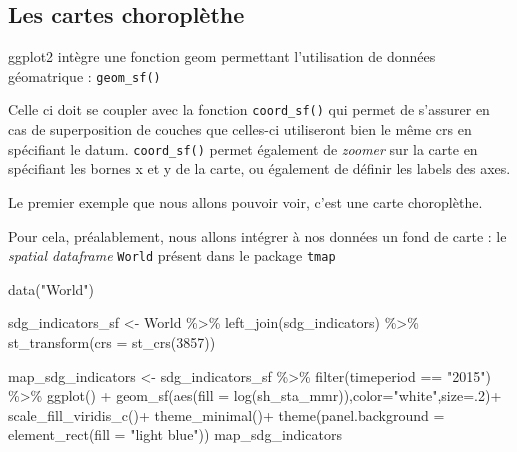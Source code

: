 \documentclass[
]{book}
\newenvironment{Shaded}{\begin{snugshade}}{\end{snugshade}}
\newcommand{\AttributeTok}[1]{\textcolor[rgb]{0.77,0.63,0.00}{#1}}
\newcommand{\DecValTok}[1]{\textcolor[rgb]{0.00,0.00,0.81}{#1}}
\newcommand{\FunctionTok}[1]{\textcolor[rgb]{0.00,0.00,0.00}{#1}}
\newcommand{\NormalTok}[1]{#1}
\newcommand{\OtherTok}[1]{\textcolor[rgb]{0.56,0.35,0.01}{#1}}
\newcommand{\SpecialCharTok}[1]{\textcolor[rgb]{0.00,0.00,0.00}{#1}}
\newcommand{\StringTok}[1]{\textcolor[rgb]{0.31,0.60,0.02}{#1}}
\begin{document}
\hypertarget{les-cartes-choropluxe8the}{%
\subsection{Les cartes choroplèthe}\label{les-cartes-choropluxe8the}}

ggplot2 intègre une fonction geom permettant l'utilisation de données géomatrique : \texttt{geom\_sf()}

Celle ci doit se coupler avec la fonction \texttt{coord\_sf()} qui permet de s'assurer en cas de superposition de couches que celles-ci utiliseront bien le même crs en spécifiant le datum. \texttt{coord\_sf()} permet également de \emph{zoomer} sur la carte en spécifiant les bornes x et y de la carte, ou également de définir les labels des axes.

Le premier exemple que nous allons pouvoir voir, c'est une carte choroplèthe.

Pour cela, préalablement, nous allons intégrer à nos données un fond de carte : le \emph{spatial dataframe} \texttt{World} présent dans le package \texttt{tmap}

\begin{Shaded}
\begin{Highlighting}[]
\FunctionTok{data}\NormalTok{(}\StringTok{"World"}\NormalTok{)}

\NormalTok{sdg\_indicators\_sf }\OtherTok{\textless{}{-}}\NormalTok{ World }\SpecialCharTok{\%\textgreater{}\%}
  \FunctionTok{left\_join}\NormalTok{(sdg\_indicators) }\SpecialCharTok{\%\textgreater{}\%}
  \FunctionTok{st\_transform}\NormalTok{(}\AttributeTok{crs =} \FunctionTok{st\_crs}\NormalTok{(}\DecValTok{3857}\NormalTok{))}
\end{Highlighting}
\end{Shaded}

\begin{Shaded}
\begin{Highlighting}[]
\NormalTok{map\_sdg\_indicators }\OtherTok{\textless{}{-}}\NormalTok{ sdg\_indicators\_sf }\SpecialCharTok{\%\textgreater{}\%} 
  \FunctionTok{filter}\NormalTok{(timeperiod }\SpecialCharTok{==} \StringTok{"2015"}\NormalTok{) }\SpecialCharTok{\%\textgreater{}\%} 
  \FunctionTok{ggplot}\NormalTok{() }\SpecialCharTok{+}
  \FunctionTok{geom\_sf}\NormalTok{(}\FunctionTok{aes}\NormalTok{(}\AttributeTok{fill =} \FunctionTok{log}\NormalTok{(sh\_sta\_mmr)),}\AttributeTok{color=}\StringTok{"white"}\NormalTok{,}\AttributeTok{size=}\NormalTok{.}\DecValTok{2}\NormalTok{)}\SpecialCharTok{+}
  \FunctionTok{scale\_fill\_viridis\_c}\NormalTok{()}\SpecialCharTok{+}
  \FunctionTok{theme\_minimal}\NormalTok{()}\SpecialCharTok{+}
  \FunctionTok{theme}\NormalTok{(}\AttributeTok{panel.background =} \FunctionTok{element\_rect}\NormalTok{(}\AttributeTok{fill =} \StringTok{"light blue"}\NormalTok{))}
\NormalTok{map\_sdg\_indicators}
\end{Highlighting}
\end{Shaded}
\end{document}
